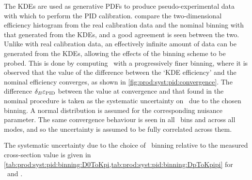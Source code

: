 The \acp{KDE} are used as generative \acp{PDF} to produce pseudo-experimental
data with which to perform the \ac{PID} calibration.
compare the two-dimensional efficiency histogram from the real calibration data
and the nominal binning with that generated from the \acp{KDE}, and a good
agreement is seen between the two.
Unlike with real calibration data, an effectively infinite amount of data can
be generated from the \acp{KDE}, allowing the effects of the binning scheme to
be probed.
This is done by computing \effpid\ with a progressively finer binning, where it
is observed that the value of the difference between the `\ac{KDE} efficiency'
and the nominal efficiency converges, as shown in
\cref{fig:prod:syst:pid:convergence}.
The difference $\delta_{B}{\varepsilon_{\textnormal{PID}}}$ between the value at convergence and that
found in the nominal procedure is taken as the systematic uncertainty on
\effpid\ due to the chosen binning.
A normal distribution is assumed for the corresponding nuisance parameter.
The same convergence behaviour is seen in all \pTy\ bins and across all modes,
and so the uncertainty is assumed to be fully correlated across them.

The systematic uncertainty due to the choice of \ptotetanspd\ binning relative
to the measured cross-section value is given in
\cref{tab:prod:syst:pid:binning:D0ToKpi,tab:prod:syst:pid:binning:DpToKpipi} for
\DzToKpi\ and \DpToKpipi.

